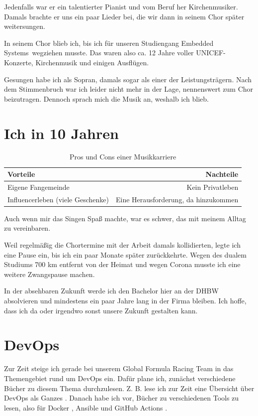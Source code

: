 \documentclass{scrartcl}
\begin{document}
Jedenfalls war er ein talentierter Pianist und vom Beruf her Kirchenmusiker.
Damals brachte er uns ein paar Lieder bei, die wir dann in seinem Chor später
weitersungen.

In seinem Chor blieb ich, bis ich für unseren Studiengang \glqq
Embedded Systems\grqq\ wegziehen musste. Das waren also ca. 12 Jahre voller
UNICEF-Konzerte, Kirchenmusik und einigen Ausflügen. 

Gesungen habe ich als Sopran, damals sogar als einer der Leistungsträgern. Nach
dem Stimmenbruch war ich leider nicht mehr in der Lage, nennenswert zum Chor
beizutragen. Dennoch sprach mich die Musik an, weshalb ich blieb.


\section{Ich in 10 Jahren}

\begin{table}[h]
\centering
    \begin{tabular}{|| l | r ||}
        \hline
        Vorteile & Nachteile \\
        \hline
        Eigene Fangemeinde & Kein Privatleben \\
        Influencerleben (viele Geschenke) & 
        Eine Herausforderung, da hinzukommen \\
        \hline
    \end{tabular}
\caption{Pros und Cons einer Musikkarriere}
\end{table}

Auch wenn mir das Singen Spaß machte, war es schwer, das mit meinem Alltag
zu vereinbaren.

Weil regelmäßig die Chortermine mit der Arbeit damals kollidierten, legte ich
eine Pause ein, bis ich ein paar Monate später zurückkehrte. Wegen des dualem
Studiums 700 km entfernt von der Heimat und wegen Corona musste ich eine
weitere Zwangspause machen.

In der absehbaren Zukunft werde ich den Bachelor hier an der DHBW absolvieren
und mindestens ein paar Jahre lang in der Firma bleiben. Ich hoffe, dass ich
da oder irgendwo sonst unsere Zukunft gestalten kann.

\section{DevOps}
Zur Zeit steige ich gerade bei unserem Global Formula Racing Team in das 
Themengebiet rund um DevOps ein. Dafür plane ich, zunächst verschiedene Bücher
zu diesem Thema durchzulesen. Z. B. lese ich zur Zeit eine Übersicht über
DevOps als Ganzes \autocite{devops}. Danach habe ich vor, Bücher zu
verschiedenen Tools zu lesen, also für Docker \autocite{docker}, Ansible 
\autocite{ansible} und GitHub Actions \autocite{github-actions}.

\printbibliography
\end{document}
